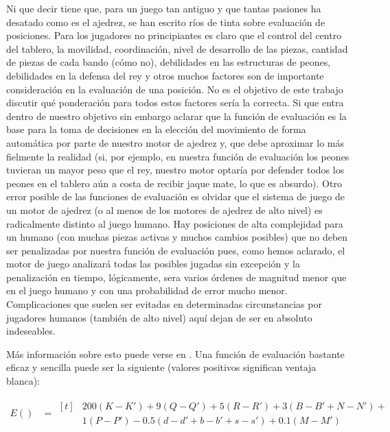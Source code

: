 \documentclass[letterpaper,12pt]{article}
\begin{document}
Ni que decir tiene que, para un juego tan antiguo y que tantas pasiones ha desatado como
es el ajedrez, se han escrito ríos de tinta sobre evaluación de posiciones. Para los 
jugadores no principiantes es claro que el control del centro del tablero, la movilidad,
coordinación, nivel de desarrollo de las piezas, cantidad de piezas de cada bando
(cómo no), debilidades en las estructuras de peones, debilidades en la defensa del rey y
otros muchos factores son de importante consideración en la evaluación de una posición.
No es el objetivo de este trabajo discutir qué ponderación para todos estos factores 
sería la correcta. Si que entra dentro de nuestro objetivo sin embargo aclarar que la 
función de evaluación es la base para la toma de decisiones en la elección del movimiento 
de forma automática por parte de nuestro motor de ajedrez y, que debe aproximar lo más 
fielmente la realidad (si, por ejemplo, en nuestra función de evaluación los peones 
tuvieran un mayor peso que el rey, nuestro motor optaría por defender todos los peones en 
el tablero aún a costa de recibir jaque mate, lo que es absurdo). Otro error posible de
las funciones de evaluación es olvidar que el sistema de juego de un motor de ajedrez
(o al menos de los motores de ajedrez de alto nivel) es radicalmente distinto al juego 
humano. Hay posiciones de alta complejidad para un humano (con muchas piezas activas y 
muchos cambios posibles) que no deben ser penalizadas por nuestra función de evaluación 
pues, como hemos aclarado, el motor de juego analizará todas las posibles jugadas sin
excepción y la penalización en tiempo, lógicamente, sera varios órdenes de magnitud menor
que en el juego humano y con una probabilidad de error mucho menor. Complicaciones que
suelen ser evitadas en determinadas circunstancias por jugadores humanos (también de alto 
nivel) aquí dejan de ser en absoluto indeseables.

Más información sobre esto puede verse en \cite{Evaluation1, Evaluation2}. Una función de
evaluación bastante eficaz y sencilla puede ser la siguiente (valores positivos significan
ventaja blanca):

\begin{align*}
  E() &= \begin{aligned}[t]
      &200(K-K') + 9(Q-Q') + 5(R-R') + 3(B-B' + N-N') + \\ 
      &1(P-P') - 0.5(d-d' + b-b' + s-s') + 0.1(M-M')
       \end{aligned}
\end{align*}
\end{document}
